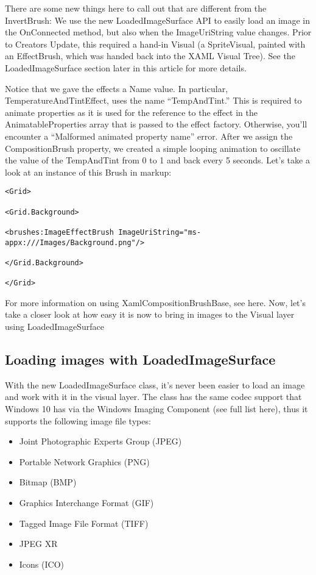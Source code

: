 There are some new things here to call out that are different from the InvertBrush:
We use the new LoadedImageSurface API to easily load an image in the OnConnected method, but also when the ImageUriString value changes. Prior to Creators Update, this required a hand-in Visual (a SpriteVisual, painted with an EffectBrush, which was handed back into the XAML Visual Tree). See the LoadedImageSurface section later in this article for more details.

Notice that we gave the effects a Name value. In particular, TemperatureAndTintEffect, uses the name “TempAndTint.” This is required to animate properties as it is used for the reference to the effect in the AnimatableProperties array that is passed to the effect factory. Otherwise, you’ll encounter a “Malformed animated property name” error.
After we assign the CompositionBrush property, we created a simple looping animation to oscillate the value of the TempAndTint from 0 to 1 and back every 5 seconds.
Let’s take a look at an instance of this Brush in markup:



\begin{lstlisting}[style=XamlStyle]
<Grid>

<Grid.Background>

<brushes:ImageEffectBrush ImageUriString="ms-appx:///Images/Background.png"/>

</Grid.Background>

</Grid>

\end{lstlisting}

For more information on using XamlCompositionBrushBase, see here. Now, let’s take a closer look at how easy it is now to bring in images to the Visual layer using LoadedImageSurface

\subsection{Loading images with LoadedImageSurface}

With the new LoadedImageSurface class, it’s never been easier to load an image and work with it in the visual layer. The class has the same codec support that Windows 10 has via the Windows Imaging Component (see full list here), thus it supports the following image file types:
\begin{itemize}
	\item Joint Photographic Experts Group (JPEG)
	\item Portable Network Graphics (PNG)
	\item Bitmap (BMP)
	\item Graphics Interchange Format (GIF)
	\item Tagged Image File Format (TIFF)
	\item JPEG XR
	\item Icons (ICO)
\end{itemize}


